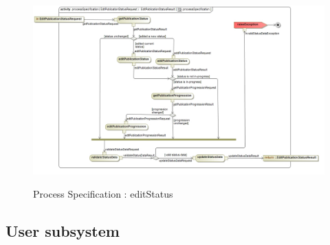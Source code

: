 \documentclass{article}
\begin{document}
		\begin{figure}[H]
		\includegraphics[width=\textwidth]{Quinton_Diagrams/act__processSpecification__processSpecification.jpg}  \\
		\caption{Process Specification : editStatus}
		\end{figure}
		


\subsection{User subsystem}
\end{document}
